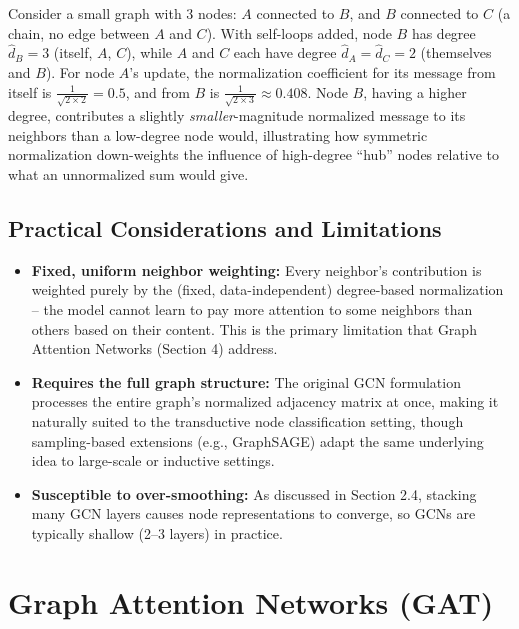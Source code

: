 \documentclass[12pt,a4paper]{article}
\begin{document}
\begin{example}
Consider a small graph with 3 nodes: $A$ connected to $B$, and $B$ connected to $C$ (a chain, no edge between $A$ and $C$). With self-loops added, node $B$ has degree $\hat{d}_B = 3$ (itself, $A$, $C$), while $A$ and $C$ each have degree $\hat{d}_A = \hat{d}_C = 2$ (themselves and $B$). For node $A$'s update, the normalization coefficient for its message from itself is $\frac{1}{\sqrt{2 \times 2}} = 0.5$, and from $B$ is $\frac{1}{\sqrt{2 \times 3}} \approx 0.408$. Node $B$, having a higher degree, contributes a slightly \emph{smaller}-magnitude normalized message to its neighbors than a low-degree node would, illustrating how symmetric normalization down-weights the influence of high-degree ``hub'' nodes relative to what an unnormalized sum would give.
\end{example}

\subsection{Practical Considerations and Limitations}

\begin{itemize}[leftmargin=1.5em]
    \item \textbf{Fixed, uniform neighbor weighting:} Every neighbor's contribution is weighted purely by the (fixed, data-independent) degree-based normalization -- the model cannot learn to pay more attention to some neighbors than others based on their content. This is the primary limitation that Graph Attention Networks (Section 4) address.
    \item \textbf{Requires the full graph structure:} The original GCN formulation processes the entire graph's normalized adjacency matrix at once, making it naturally suited to the transductive node classification setting, though sampling-based extensions (e.g., GraphSAGE) adapt the same underlying idea to large-scale or inductive settings.
    \item \textbf{Susceptible to over-smoothing:} As discussed in Section 2.4, stacking many GCN layers causes node representations to converge, so GCNs are typically shallow (2--3 layers) in practice.
\end{itemize}

\newpage

\section{Graph Attention Networks (GAT)}
\end{document}
